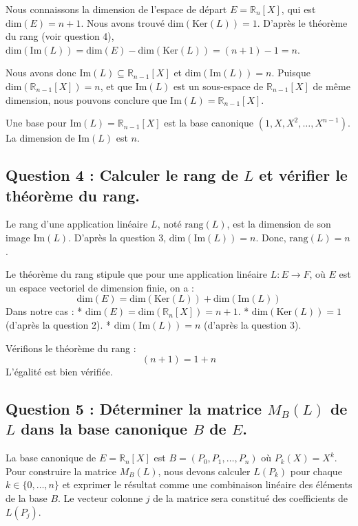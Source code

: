 \documentclass{report}
\begin{document}
Nous connaissons la dimension de l'espace de départ $E = \mathbb{R}_n[X]$, qui est $\mathrm{dim}(E) = n+1$.
Nous avons trouvé $\mathrm{dim}(\mathrm{Ker}(L)) = 1$.
D'après le théorème du rang (voir question 4), $\mathrm{dim}(\mathrm{Im}(L)) = \mathrm{dim}(E) - \mathrm{dim}(\mathrm{Ker}(L)) = (n+1) - 1 = n$.

Nous avons donc $\mathrm{Im}(L) \subseteq \mathbb{R}_{n-1}[X]$ et $\mathrm{dim}(\mathrm{Im}(L)) = n$.
Puisque $\mathrm{dim}(\mathbb{R}_{n-1}[X]) = n$, et que $\mathrm{Im}(L)$ est un sous-espace de $\mathbb{R}_{n-1}[X]$ de même dimension, nous pouvons conclure que $\mathrm{Im}(L) = \mathbb{R}_{n-1}[X]$.

Une base pour $\mathrm{Im}(L) = \mathbb{R}_{n-1}[X]$ est la base canonique $(1, X, X^2, \dots, X^{n-1})$.
La dimension de $\mathrm{Im}(L)$ est $n$.

\subsection*{Question 4 : Calculer le rang de $L$ et vérifier le théorème du rang.}

Le rang d'une application linéaire $L$, noté $\mathrm{rang}(L)$, est la dimension de son image $\mathrm{Im}(L)$.
D'après la question 3, $\mathrm{dim}(\mathrm{Im}(L)) = n$.
Donc, $\mathrm{rang}(L) = n$.

Le théorème du rang stipule que pour une application linéaire $L: E \to F$, où $E$ est un espace vectoriel de dimension finie, on a :
$$\mathrm{dim}(E) = \mathrm{dim}(\mathrm{Ker}(L)) + \mathrm{dim}(\mathrm{Im}(L))$$
Dans notre cas :
*   $\mathrm{dim}(E) = \mathrm{dim}(\mathbb{R}_n[X]) = n+1$.
*   $\mathrm{dim}(\mathrm{Ker}(L)) = 1$ (d'après la question 2).
*   $\mathrm{dim}(\mathrm{Im}(L)) = n$ (d'après la question 3).

Vérifions le théorème du rang :
$$(n+1) = 1 + n$$
L'égalité est bien vérifiée.

\subsection*{Question 5 : Déterminer la matrice $M_B(L)$ de $L$ dans la base canonique $B$ de $E$.}

La base canonique de $E = \mathbb{R}_n[X]$ est $B = (P_0, P_1, \dots, P_n)$ où $P_k(X) = X^k$.
Pour construire la matrice $M_B(L)$, nous devons calculer $L(P_k)$ pour chaque $k \in \{0, \dots, n\}$ et exprimer le résultat comme une combinaison linéaire des éléments de la base $B$. Le vecteur colonne $j$ de la matrice sera constitué des coefficients de $L(P_j)$.
\end{document}
